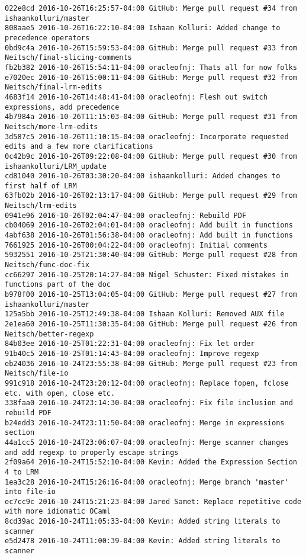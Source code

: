 \begin{lstlisting}
022e8cd 2016-10-26T16:25:57-04:00 GitHub: Merge pull request #34 from ishaankolluri/master
808aae5 2016-10-26T16:22:10-04:00 Ishaan Kolluri: Added change to precedence operators
0bd9c4a 2016-10-26T15:59:53-04:00 GitHub: Merge pull request #33 from Neitsch/final-slicing-comments
fb2b382 2016-10-26T15:54:11-04:00 oracleofnj: Thats all for now folks
e7020ec 2016-10-26T15:00:11-04:00 GitHub: Merge pull request #32 from Neitsch/final-lrm-edits
4683f14 2016-10-26T14:48:41-04:00 oracleofnj: Flesh out switch expressions, add precedence
4b7984a 2016-10-26T11:15:03-04:00 GitHub: Merge pull request #31 from Neitsch/more-lrm-edits
3d587c5 2016-10-26T11:10:15-04:00 oracleofnj: Incorporate requested edits and a few more clarifications
0c42b9c 2016-10-26T09:22:08-04:00 GitHub: Merge pull request #30 from ishaankolluri/LRM_update
cd81040 2016-10-26T03:30:20-04:00 ishaankolluri: Added changes to first half of LRM
63fb02b 2016-10-26T02:13:17-04:00 GitHub: Merge pull request #29 from Neitsch/lrm-edits
0941e96 2016-10-26T02:04:47-04:00 oracleofnj: Rebuild PDF
cb04069 2016-10-26T02:04:01-04:00 oracleofnj: Add built in functions
4abf638 2016-10-26T01:56:38-04:00 oracleofnj: Add built in functions
7661925 2016-10-26T00:04:22-04:00 oracleofnj: Initial comments
5932551 2016-10-25T21:30:40-04:00 GitHub: Merge pull request #28 from Neitsch/func-doc-fix
cc66297 2016-10-25T20:14:27-04:00 Nigel Schuster: Fixed mistakes in functions part of the doc
b978f00 2016-10-25T13:04:05-04:00 GitHub: Merge pull request #27 from ishaankolluri/master
125a5bb 2016-10-25T12:49:38-04:00 Ishaan Kolluri: Removed AUX file
2e1ea60 2016-10-25T11:30:35-04:00 GitHub: Merge pull request #26 from Neitsch/better-regexp
84b03ee 2016-10-25T01:22:31-04:00 oracleofnj: Fix let order
91b40c5 2016-10-25T01:14:43-04:00 oracleofnj: Improve regexp
eb24036 2016-10-24T23:55:38-04:00 GitHub: Merge pull request #23 from Neitsch/file-io
991c918 2016-10-24T23:20:12-04:00 oracleofnj: Replace fopen, fclose etc. with open, close etc.
338faa0 2016-10-24T23:14:30-04:00 oracleofnj: Fix file inclusion and rebuild PDF
b24edd3 2016-10-24T23:11:50-04:00 oracleofnj: Merge in expressions section
44a1cc5 2016-10-24T23:06:07-04:00 oracleofnj: Merge scanner changes and add regexp to properly escape strings
2f09a64 2016-10-24T15:52:10-04:00 Kevin: Added the Expression Section 4 to LRM
1ea3c28 2016-10-24T15:26:16-04:00 oracleofnj: Merge branch 'master' into file-io
ec7cc9c 2016-10-24T15:21:23-04:00 Jared Samet: Replace repetitive code with more idiomatic OCaml
8cd39ac 2016-10-24T11:05:33-04:00 Kevin: Added string literals to scanner
e5d2478 2016-10-24T11:00:39-04:00 Kevin: Added string literals to scanner

\end{lstlisting}
